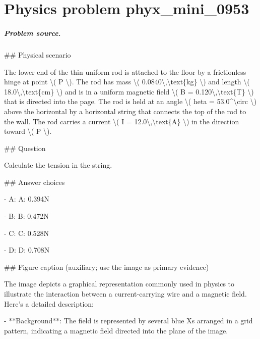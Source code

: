 
\chapter{Physics problem phyx\_mini\_0953}
\label{ch:PhyXMiniProblems_problem_phyx_mini_0953}

\paragraph{Problem source.}
\#\# Physical scenario

The lower end of the thin uniform rod is attached to the floor by a frictionless hinge at point \textbackslash{}( P \textbackslash{}). The rod has mass \textbackslash{}( 0.0840\textbackslash{},\textbackslash{}text\{kg\} \textbackslash{}) and length \textbackslash{}( 18.0\textbackslash{},\textbackslash{}text\{cm\} \textbackslash{}) and is in a uniform magnetic field \textbackslash{}( B = 0.120\textbackslash{},\textbackslash{}text\{T\} \textbackslash{}) that is directed into the page. The rod is held at an angle \textbackslash{}( 	heta = 53.0\textasciicircum{}\textbackslash{}circ \textbackslash{}) above the horizontal by a horizontal string that connects the top of the rod to the wall. The rod carries a current \textbackslash{}( I = 12.0\textbackslash{},\textbackslash{}text\{A\} \textbackslash{}) in the direction toward \textbackslash{}( P \textbackslash{}).

\#\# Question

Calculate the tension in the string.

\#\# Answer choices

- A: A: 0.394N

- B: B: 0.472N

- C: C: 0.528N

- D: D: 0.708N

\#\# Figure caption (auxiliary; use the image as primary evidence)

The image depicts a graphical representation commonly used in physics to illustrate the interaction between a current-carrying wire and a magnetic field. Here's a detailed description:

- **Background**: The field is represented by several blue Xs arranged in a grid pattern, indicating a magnetic field directed into the plane of the image.

